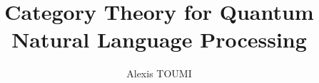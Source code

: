 

\title{Category Theory for Quantum\\
Natural Language Processing}
\author{Alexis TOUMI}

\degreedate{\today}



% 





%
% 
%
%
%
%


\setlength{\baselineskip}{0pt} %

{\renewcommand*\MakeUppercase[1]{#1}%
\printbibliography[heading=bibintoc,title={\bibtitle}]}


